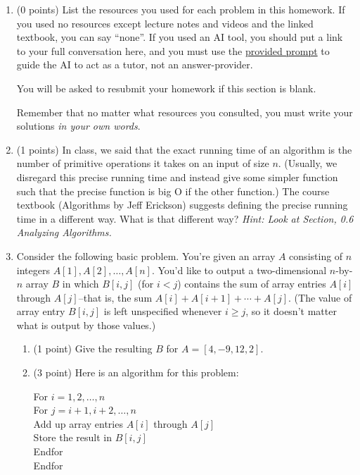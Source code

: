 \documentclass[11pt]{article}
\begin{document}


\begin{enumerate}


\item (0 points) List the resources you used for each problem in this homework. If you used no resources except
lecture notes and videos and the linked textbook, you can say ``none''. If you used
an AI tool, you should put a link to your full conversation here, and you must
use the
\href{https://umaal.org/files/teaching/csci332_fall2026/agents.md}{provided
prompt}
 to guide the AI to act
as a tutor, not an answer-provider.

You will be asked to resubmit your homework if this section is blank.

Remember that no matter what resources you consulted, you must write your solutions
\emph{in your own words}.

\item (1 points) In class, we said that the exact running time of an algorithm is the number of primitive operations it
takes on an input of size $n$. (Usually, we disregard this precise running time and instead give some simpler function
such that the precise function is big O if the other function.)
The course textbook (Algorithms by Jeff Erickson) suggests defining the precise running time in a different way.
What is that different way? \emph{Hint: Look at Section, 0.6 Analyzing Algorithms.}

\item Consider the following basic problem. You're given an array $A$ consisting of
$n$ integers $A[1], A[2], \ldots, A[n]$. You'd like to output a two-dimensional
$n$-by-$n$ array $B$ in which $B[i,j]$ (for $i < j$) contains the sum of array
entries $A[i]$ through $A[j]$--that is, the sum $A[i] + A[i+1] + \cdots + A[j]$.
(The value of array entry $B[i,j]$ is left unspecified whenever $i \geq j$, so
it doesn't matter what is output by those values.)
\begin{enumerate}
\item (1 point) Give the resulting $B$ for $A=[4, -9, 12, 2]$.
\item (3 point) Here is an algorithm for this problem:

\begin{algo}
   For $i = 1, 2, \ldots, n$\+ \\
   For $j = i + 1, i + 2, \ldots, n$\+ \\
   Add up array entries $A[i]$ through $A[j]$\\
   Store the result in $B[i,j]$\- \\
   Endfor\- \\
   Endfor
\end{algo}


\end{enumerate}
\end{enumerate}
\end{document}
